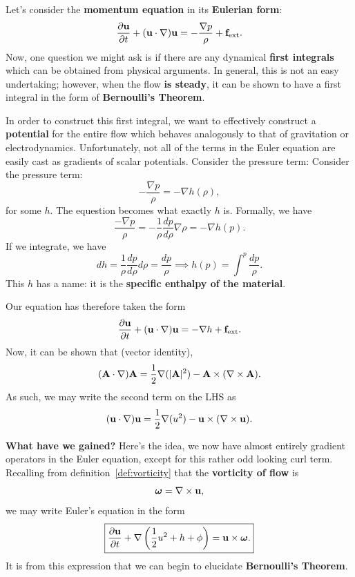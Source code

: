 Let's consider the \textbf{momentum equation} in its \textbf{Eulerian form}:
\[
\frac{\partial {\bf u}}{\partial t} + ({\bf u} \cdot \nabla){\bf u} = -\frac{\nabla p}{\rho} + {\bf f}_{\rm ext}.
\]
Now, one question we might ask is if there are any dynamical \textbf{first integrals} which can be obtained from physical arguments. In general, this is not an easy undertaking; however, when the flow \textbf{is steady}, it can be shown to have a first integral in the form of \textbf{Bernoulli's Theorem}.
\par
In order to construct this first integral, we want to effectively construct a \textbf{potential} for the entire flow which behaves analogously to that of gravitation or electrodynamics. Unfortunately, not all of the terms in the Euler equation are easily cast as gradients of scalar potentials. Consider the pressure term:
 Consider the pressure term:
\[
-\frac{\nabla p}{\rho} = -\nabla h(\rho),
\]
for some $h$. The equestion becomes what exactly $h$ is. Formally, we have
\[
\frac{-\nabla p}{\rho} = - \frac{1}{\rho}\frac{dp}{d\rho} \nabla \rho = - \nabla h(p).
\]
If we integrate, we have
\[
dh = \frac{1}{\rho} \frac{dp}{d\rho} d\rho = \frac{dp}{\rho} \implies h(p) = \int^p \frac{dp}{\rho}.
\]
This $h$ has a name: it is the \textbf{specific enthalpy of the material}. 

Our equation has therefore taken the form
\[
\frac{\partial {\bf u}}{\partial t} + ({\bf u} \cdot \nabla){\bf u}  = -\nabla h+ {\bf f}_{\rm ext}.
\]
Now, it can be shown that (vector identity),
\[
({\bf A} \cdot \nabla){\bf A} = \frac{1}{2}\nabla(|{\bf A}|^2) - {\bf A} \times (\nabla \times {\bf A}).
\]
 As such, we may write the second term on the LHS as
\[
({\bf u \cdot \nabla}){\bf u}  = \frac{1}{2}\nabla(u^2) - {\bf u} \times (\nabla \times {\bf u}).
\]
\par
\textbf{What have we gained?} Here's the idea, we now have almost entirely gradient operators in the Euler equation, except for this rather odd looking curl term. Recalling from definition~\ref{def:vorticity} that
the \textbf{vorticity of flow} is
\[
\boldsymbol{\omega} = \nabla \times {\bf u},
\]
we may write Euler's equation in the form
\[
\boxed{
\frac{\partial {\bf u}}{\partial t} +\nabla\left(\frac{1}{2}u^2 + h + \phi\right) = {\bf u} \times \boldsymbol{\omega}.}
\]
It is from this expression that we can begin to elucidate \textbf{Bernoulli's Theorem}.


